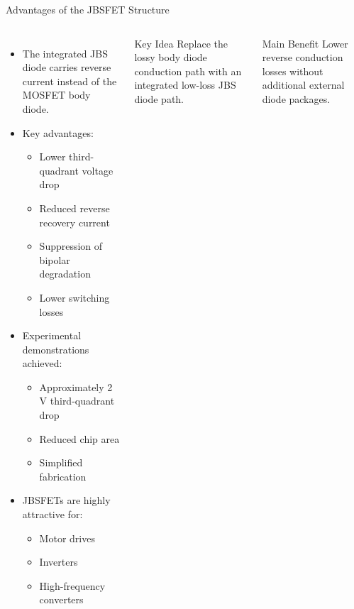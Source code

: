 \begin{frame}{Advantages of the JBSFET Structure}
\begin{columns}[T]


\begin{itemize}
    \item The integrated JBS diode carries reverse current instead of the MOSFET body diode.

    \item Key advantages:
    \begin{itemize}
        \item Lower third-quadrant voltage drop
        \item Reduced reverse recovery current
        \item Suppression of bipolar degradation
        \item Lower switching losses
    \end{itemize}

    \item Experimental demonstrations achieved:
    \begin{itemize}
        \item Approximately 2 V third-quadrant drop
        \item Reduced chip area
        \item Simplified fabrication
    \end{itemize}

    \item JBSFETs are highly attractive for:
    \begin{itemize}
        \item Motor drives
        \item Inverters
        \item High-frequency converters
    \end{itemize}
\end{itemize}


\begin{block}{Key Idea}
\small
Replace the lossy body diode conduction path with an integrated low-loss JBS diode path.
\end{block}

\vspace{0.3cm}

\begin{block}{Main Benefit}
\small
Lower reverse conduction losses without additional external diode packages.
\end{block}

\end{columns}
\end{frame}



